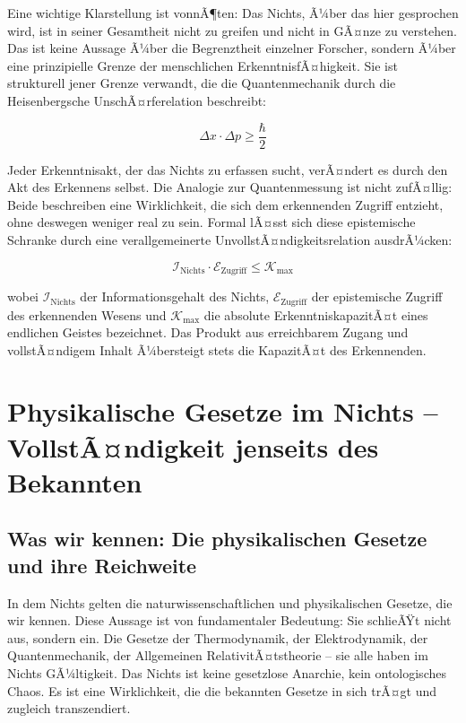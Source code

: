 ﻿\documentclass[12pt,a4paper]{report}
\begin{document}
Eine wichtige Klarstellung ist vonnÃ¶ten: Das Nichts, Ã¼ber das hier gesprochen wird, ist in seiner Gesamtheit nicht zu greifen und nicht in GÃ¤nze zu verstehen. Das ist keine Aussage Ã¼ber die Begrenztheit einzelner Forscher, sondern Ã¼ber eine prinzipielle Grenze der menschlichen ErkenntnisfÃ¤higkeit. Sie ist strukturell jener Grenze verwandt, die die Quantenmechanik durch die Heisenbergsche UnschÃ¤rferelation beschreibt:

\begin{equation}
	\Delta x \cdot \Delta p \geq \frac{\hbar}{2}
\end{equation}

Jeder Erkenntnisakt, der das Nichts zu erfassen sucht, verÃ¤ndert es durch den Akt des Erkennens selbst. Die Analogie zur Quantenmessung ist nicht zufÃ¤llig: Beide beschreiben eine Wirklichkeit, die sich dem erkennenden Zugriff entzieht, ohne deswegen weniger real zu sein. Formal lÃ¤sst sich diese epistemische Schranke durch eine verallgemeinerte UnvollstÃ¤ndigkeitsrelation ausdrÃ¼cken:

\begin{equation}
	\mathcal{I}_{\text{Nichts}} \cdot \mathcal{E}_{\text{Zugriff}} \leq \mathcal{K}_{\max}
	\label{eq:erkenntnis_schranke}
\end{equation}

wobei $\mathcal{I}_{\text{Nichts}}$ der Informationsgehalt des Nichts, $\mathcal{E}_{\text{Zugriff}}$ der epistemische Zugriff des erkennenden Wesens und $\mathcal{K}_{\max}$ die absolute ErkenntniskapazitÃ¤t eines endlichen Geistes bezeichnet. Das Produkt aus erreichbarem Zugang und vollstÃ¤ndigem Inhalt Ã¼bersteigt stets die KapazitÃ¤t des Erkennenden.

\section{Physikalische Gesetze im Nichts -- VollstÃ¤ndigkeit jenseits des Bekannten}

\subsection{Was wir kennen: Die physikalischen Gesetze und ihre Reichweite}

In dem Nichts gelten die naturwissenschaftlichen und physikalischen Gesetze, die wir kennen. Diese Aussage ist von fundamentaler Bedeutung: Sie schlieÃŸt nicht aus, sondern ein. Die Gesetze der Thermodynamik, der Elektrodynamik, der Quantenmechanik, der Allgemeinen RelativitÃ¤tstheorie -- sie alle haben im Nichts GÃ¼ltigkeit. Das Nichts ist keine gesetzlose Anarchie, kein ontologisches Chaos. Es ist eine Wirklichkeit, die die bekannten Gesetze in sich trÃ¤gt und zugleich transzendiert.
\end{document}

